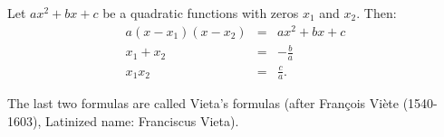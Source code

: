 \begin{frame}
\begin{proposition}
Let $ax^2+bx+c$ be a quadratic functions with zeros $x_1$ and $x_2$. Then:
\[
\begin{array}{rcl}
\displaystyle a(x-x_1)(x-x_2)&=&\displaystyle ax^2+bx+c\\
\displaystyle x_1+x_2&=&\displaystyle -\frac{b}{a}\\
\displaystyle x_1x_2&=&\displaystyle \frac{c}{a}.
\end{array}
\]
\end{proposition}
The last two formulas are called Vieta's formulas (after Fran\c{c}ois Vi\`ete (1540-1603), Latinized name: Franciscus Vieta).

\end{frame}